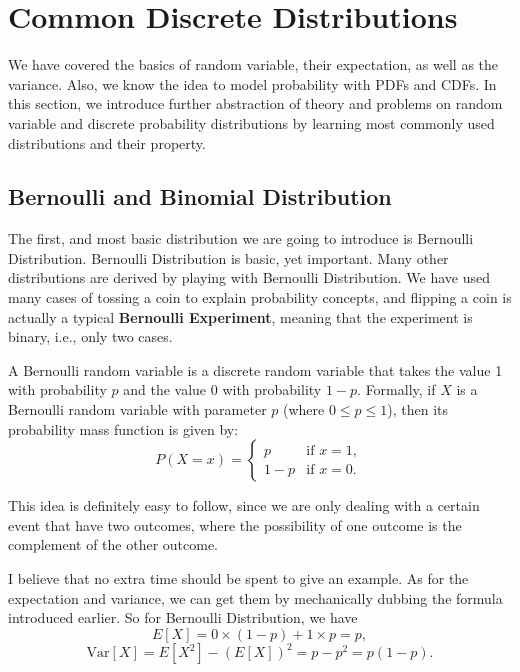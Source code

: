 \section{Common Discrete Distributions}
We have covered the basics of random variable, their expectation, as well as the variance. Also, we know the idea to model probability with PDFs and CDFs. In this section, we introduce further abstraction of theory and problems on random variable and discrete probability distributions by learning most commonly used distributions and their property.
\subsection{Bernoulli and Binomial Distribution}
The first, and most basic distribution we are going to introduce is Bernoulli Distribution. Bernoulli Distribution is basic, yet important. Many other distributions are derived by playing with Bernoulli Distribution. We have used many cases of tossing a coin to explain probability concepts, and flipping a coin is actually a typical \textbf{Bernoulli Experiment}, meaning that the experiment is binary, i.e., only two cases.

\begin{definition}
    A Bernoulli random variable is a discrete random variable that takes the value 1 with probability \( p \) and the value 0 with probability \( 1-p \). Formally, if \( X \) is a Bernoulli random variable with parameter \( p \) (where \( 0 \leq p \leq 1 \)), then its probability mass function is given by:
    \[
    P(X = x) = \begin{cases} 
    p & \text{if } x = 1, \\
    1-p & \text{if } x = 0.
    \end{cases}
    \]
\end{definition}

This idea is definitely easy to follow, since we are only dealing with a certain event that have two outcomes, where the possibility of one outcome is the complement of the other outcome. 

I believe that no extra time should be spent to give an example. As for the expectation and variance, we can get them by mechanically dubbing the formula introduced earlier. So for Bernoulli Distribution, we have
\begin{equation}
    E[X] = 0\times(1-p) + 1\times p = p,
\end{equation}
\begin{equation}
    \text{Var}[X] = E[X^2] - (E[X])^2 = p-p^2 = p(1-p).
\end{equation}

